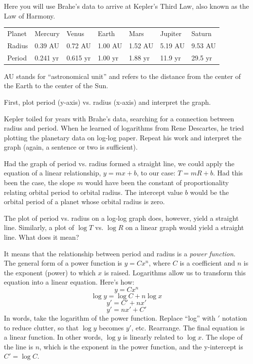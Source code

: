 \documentclass[11pt,letterpaper]{article}
\begin{document}
Here you will use Brahe's data to arrive at Kepler's Third Law, also known as the Law of Harmony.
\begin{center}
\begin{tabular}{lllllll}
Planet & Mercury & Venus & Earth & Mars & Jupiter & Saturn\\
Radius & 0.39 AU & 0.72 AU & 1.00 AU & 1.52 AU & 5.19 AU & 9.53 AU\\
Period & 0.241 yr & 0.615 yr & 1.00 yr & 1.88 yr & 11.9 yr & 29.5 yr\\
\end{tabular}
\end{center}

AU stands for ``astronomical unit'' and refers to the distance from the center of the Earth to the center of the Sun.

First, plot period (y-axis) vs. radius (x-axis) and interpret the graph.

Kepler toiled for years with Brahe's data, searching for a connection
between radius and period. When he learned of logarithms from Rene
Descartes, he tried plotting the planetary data on log-log paper.
Repeat his work and interpret the graph (again, a sentence or two is sufficient).

Had the graph of period vs. radius formed a straight line, we could
apply the equation of a linear relationship, $y=mx+b$, to our case:
$T=mR+b$. Had this been the case, the slope $m$ would have been the
constant of proportionality relating orbital period to orbital radius.
The intercept value $b$ would be the orbital period of a planet whose
orbital radius is zero. 

The plot of period vs. radius on a log-log graph does, however, yield a straight
line. Similarly, a plot of $\log T$ vs. $\log R$ on a linear graph would yield a straight line. What does it mean?

It means that the relationship between period and radius is a {\it power
  function}. The general form of a power function is $y=Cx^n$, where
$C$ is a coefficient and $n$ is the exponent (power) to which $x$ is
raised.  Logarithms allow us to transform this equation into a linear
equation. Here's how:
$$y = Cx^n $$
$$\log y = \log C + n \log x$$
$$ y' = C' + nx'$$
$$ y' = nx' + C'$$
In words, take the logarithm of the power function.  Replace ``log'' with $'$
notation to reduce clutter, so that $\log y$ becomes $y'$,
etc. Rearrange. The final equation is a linear function. In other words, $\log y$ is linearly related to $\log x$. The slope of the line is $n$, which is the exponent in the power function, and the y-intercept is $C'=\log C$.
\end{document}
